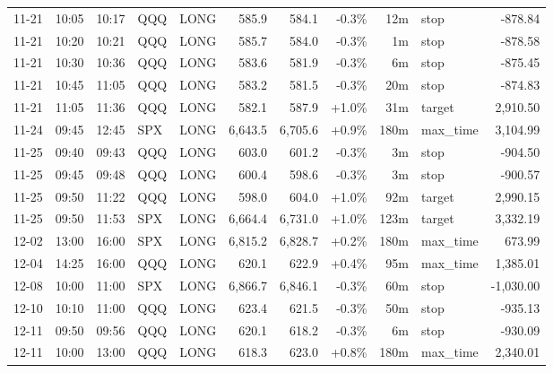 \documentclass[11pt,a4paper,twoside]{article}
\begin{document}
\begin{center}
\begin{longtable}{>{\color{txtmain}}l l l l l r r r r >{\color{txtmain}}l r}
11-21 & 10:05 & 10:17 & QQQ & LONG & 585.9 & 584.1 & \textcolor{lossred}{-0.3\%} & 12m & stop & \textcolor{lossred}{-878.84} \\
11-21 & 10:20 & 10:21 & QQQ & LONG & 585.7 & 584.0 & \textcolor{lossred}{-0.3\%} & 1m & stop & \textcolor{lossred}{-878.58} \\
11-21 & 10:30 & 10:36 & QQQ & LONG & 583.6 & 581.9 & \textcolor{lossred}{-0.3\%} & 6m & stop & \textcolor{lossred}{-875.45} \\
11-21 & 10:45 & 11:05 & QQQ & LONG & 583.2 & 581.5 & \textcolor{lossred}{-0.3\%} & 20m & stop & \textcolor{lossred}{-874.83} \\
11-21 & 11:05 & 11:36 & QQQ & LONG & 582.1 & 587.9 & \textcolor{wingreen}{+1.0\%} & 31m & target & \textcolor{wingreen}{2,910.50} \\
11-24 & 09:45 & 12:45 & SPX & LONG & 6,643.5 & 6,705.6 & \textcolor{wingreen}{+0.9\%} & 180m & max\_time & \textcolor{wingreen}{3,104.99} \\
11-25 & 09:40 & 09:43 & QQQ & LONG & 603.0 & 601.2 & \textcolor{lossred}{-0.3\%} & 3m & stop & \textcolor{lossred}{-904.50} \\
11-25 & 09:45 & 09:48 & QQQ & LONG & 600.4 & 598.6 & \textcolor{lossred}{-0.3\%} & 3m & stop & \textcolor{lossred}{-900.57} \\
11-25 & 09:50 & 11:22 & QQQ & LONG & 598.0 & 604.0 & \textcolor{wingreen}{+1.0\%} & 92m & target & \textcolor{wingreen}{2,990.15} \\
11-25 & 09:50 & 11:53 & SPX & LONG & 6,664.4 & 6,731.0 & \textcolor{wingreen}{+1.0\%} & 123m & target & \textcolor{wingreen}{3,332.19} \\
12-02 & 13:00 & 16:00 & SPX & LONG & 6,815.2 & 6,828.7 & \textcolor{wingreen}{+0.2\%} & 180m & max\_time & \textcolor{wingreen}{673.99} \\
12-04 & 14:25 & 16:00 & QQQ & LONG & 620.1 & 622.9 & \textcolor{wingreen}{+0.4\%} & 95m & max\_time & \textcolor{wingreen}{1,385.01} \\
12-08 & 10:00 & 11:00 & SPX & LONG & 6,866.7 & 6,846.1 & \textcolor{lossred}{-0.3\%} & 60m & stop & \textcolor{lossred}{-1,030.00} \\
12-10 & 10:10 & 11:00 & QQQ & LONG & 623.4 & 621.5 & \textcolor{lossred}{-0.3\%} & 50m & stop & \textcolor{lossred}{-935.13} \\
12-11 & 09:50 & 09:56 & QQQ & LONG & 620.1 & 618.2 & \textcolor{lossred}{-0.3\%} & 6m & stop & \textcolor{lossred}{-930.09} \\
12-11 & 10:00 & 13:00 & QQQ & LONG & 618.3 & 623.0 & \textcolor{wingreen}{+0.8\%} & 180m & max\_time & \textcolor{wingreen}{2,340.01} \\

\end{longtable}
\end{center}
\end{document}
